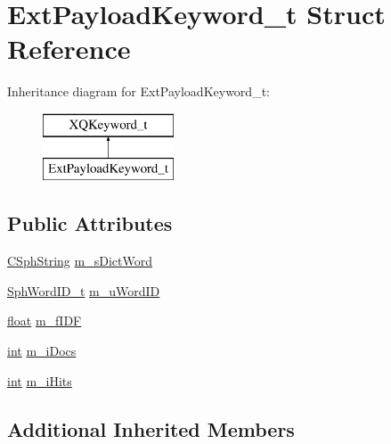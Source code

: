 \hypertarget{structExtPayloadKeyword__t}{\section{Ext\-Payload\-Keyword\-\_\-t Struct Reference}
\label{structExtPayloadKeyword__t}
}
Inheritance diagram for Ext\-Payload\-Keyword\-\_\-t\-:\begin{figure}[H]
\begin{center}
\leavevmode
\includegraphics[height=2.000000cm]{structExtPayloadKeyword__t}
\end{center}
\end{figure}
\subsection*{Public Attributes}
\begin{DoxyCompactItemize}
\item 
\hyperlink{structCSphString}{C\-Sph\-String} \hyperlink{structExtPayloadKeyword__t_a36ad850bbd0c8442fcbf5e8b319b3542}{m\-\_\-s\-Dict\-Word}
\item 
\hyperlink{sphinx_8h_a80a94d5984fdf9214a98f3e5e65df963}{Sph\-Word\-I\-D\-\_\-t} \hyperlink{structExtPayloadKeyword__t_a8531da61021a38953c7b5f92460fdac8}{m\-\_\-u\-Word\-I\-D}
\item 
\hyperlink{sphinxexpr_8cpp_a0e0d0739f7035f18f949c2db2c6759ec}{float} \hyperlink{structExtPayloadKeyword__t_a846c08d590571c660a00ed135dfb75fc}{m\-\_\-f\-I\-D\-F}
\item 
\hyperlink{sphinxexpr_8cpp_a4a26e8f9cb8b736e0c4cbf4d16de985e}{int} \hyperlink{structExtPayloadKeyword__t_acb15230617e89d8e7f17d53dd24012dc}{m\-\_\-i\-Docs}
\item 
\hyperlink{sphinxexpr_8cpp_a4a26e8f9cb8b736e0c4cbf4d16de985e}{int} \hyperlink{structExtPayloadKeyword__t_a0055f014bac79fb4da635642968ee6bf}{m\-\_\-i\-Hits}
\end{DoxyCompactItemize}
\subsection*{Additional Inherited Members}


